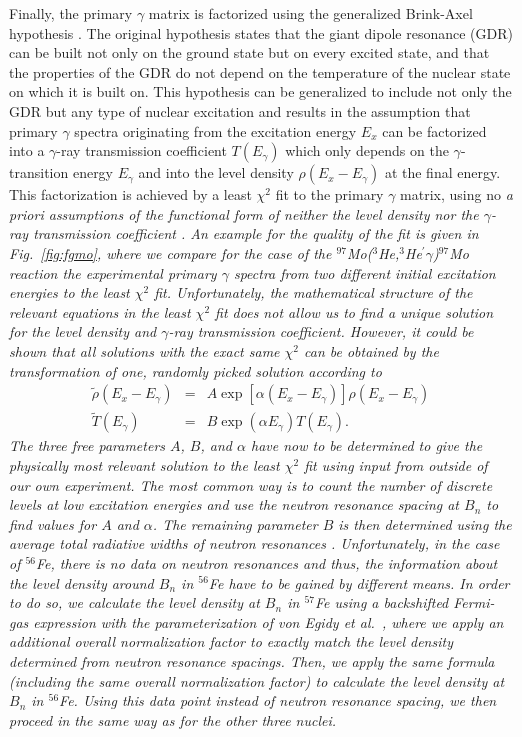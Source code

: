 \begin{multicols}{2}
Finally, the primary $\gamma$ matrix is factorized using the generalized 
Brink-Axel hypothesis \cite{Br55,Ax62}. The original hypothesis states that the
giant dipole resonance (GDR) can be built not only on the ground state but on 
every excited state, and that the properties of the GDR do not depend on the
temperature of the nuclear state on which it is built on. This hypothesis can 
be generalized to include not only the GDR but any type of nuclear excitation 
and results in the assumption that primary $\gamma$ spectra originating from 
the excitation energy $E_x$ can be factorized into a $\gamma$-ray transmission 
coefficient $T(E_\gamma)$ which only depends on the $\gamma$-transition energy 
$E_\gamma$ and into the level density $\rho(E_x-E_\gamma)$ at the final energy.
This factorization is achieved by a least $\chi^2$ fit to the primary $\gamma$
matrix, using no \sl a priori \rm assumptions of the functional form of neither
the level density nor the $\gamma$-ray transmission coefficient \cite{SB00}. 
An example for the quality of the fit is given in Fig.\ \ref{fig:fgmo}, where 
we compare for the case of the $^{97}$Mo($^3$He,$^3$He$^\prime\gamma$)$^{97}$Mo
reaction the experimental primary $\gamma$ spectra from two different initial 
excitation energies to the least $\chi^2$ fit. Unfortunately, the mathematical 
structure of the relevant equations in the least $\chi^2$ fit does not allow us
to find a unique solution for the level density and $\gamma$-ray transmission 
coefficient. However, it could be shown that all solutions with the exact same 
$\chi^2$ can be obtained by the transformation of one, randomly picked solution
according to \cite{SB00}
\begin{eqnarray}
\tilde{\rho}(E_x-E_\gamma)&=&A\exp[\alpha(E_x-E_\gamma)]\rho(E_x-E_\gamma)\\
\tilde{T}(E_\gamma)&=&B\exp(\alpha E_\gamma)T(E_\gamma).
\end{eqnarray}
The three free parameters $A$, $B$, and $\alpha$ have now to be determined to 
give the physically most relevant solution to the least $\chi^2$ fit using 
input from outside of our own experiment. The most common way is to count the
number of discrete levels at low excitation energies and use the neutron 
resonance spacing at $B_n$ to find values for $A$ and $\alpha$. The remaining
parameter $B$ is then determined using the average total radiative widths of 
neutron resonances \cite{VG01}. Unfortunately, in the case of $^{56}$Fe, there
is no data on neutron resonances and thus, the information about the level 
density around $B_n$ in $^{56}$Fe have to be gained by different means. In
order to do so, we calculate the level density at $B_n$ in $^{57}$Fe using a
backshifted Fermi-gas expression with the parameterization of von Egidy \sl et 
al.\ \rm \cite{ES88}, where we apply an additional overall normalization factor
to exactly match the level density determined from neutron resonance spacings. 
Then, we apply the same formula (including the same overall normalization 
factor) to calculate the level density at $B_n$ in $^{56}$Fe. Using this data
point instead of neutron resonance spacing, we then proceed in the same way as
for the other three nuclei. 


\end{multicols}
